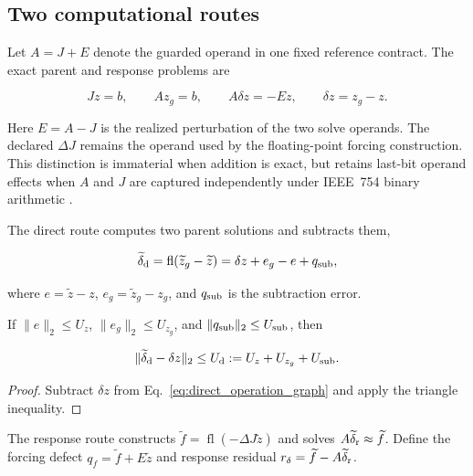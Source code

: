 \subsection{Two computational routes}

Let $A=J+E$ denote the guarded operand in one fixed reference contract.
The exact parent and response problems are
\begin{linenomath*}
\begin{equation}
Jz=b,\qquad Az_g=b,\qquad A\delta z=-Ez,
\qquad \delta z=z_g-z.
\label{eq:route_exact_problems}
\end{equation}
\end{linenomath*}
Here $E=A-J$ is the realized perturbation of the two solve operands. The
declared $\Delta J$ remains the operand used by the floating-point
forcing construction. This distinction is immaterial when addition is exact,
but retains last-bit operand effects when $A$ and $J$ are captured
independently under IEEE~754 binary arithmetic \cite{S09,S10}.

The direct route computes two parent solutions and subtracts them,
\begin{linenomath*}
\begin{equation}
\widetilde\delta_{\rm d}
=\operatorname{fl}(\widetilde z_g-\widetilde z)
=\delta z+e_g-e+q_{\rm sub},
\label{eq:direct_operation_graph}
\end{equation}
\end{linenomath*}
where $e=\widetilde z-z$, $e_g=\widetilde z_g-z_g$, and
$q_{\rm sub}$ is the subtraction error.

\begin{proposition}
\label{prop:p4}
If $\lVert e\rVert_2\leq U_z$,
$\lVert e_g\rVert_2\leq U_{z_g}$, and
$\lVert q_{\rm sub}\rVert_2\leq U_{\rm sub}$, then
\begin{linenomath*}
\begin{equation}
\lVert\widetilde\delta_{\rm d}-\delta z\rVert_2
\leq U_{\rm d}:=U_z+U_{z_g}+U_{\rm sub}.
\label{eq:direct_difference_enclosure}
\end{equation}
\end{linenomath*}
\end{proposition}

\begin{proof}
Subtract $\delta z$ from Eq.~\eqref{eq:direct_operation_graph} and apply
the triangle inequality.
\end{proof}

The response route constructs
$\widetilde f=\operatorname{fl}(-\Delta J\widetilde z)$ and solves
$A\widetilde\delta_{\rm r}\approx\widetilde f$. Define the forcing
defect $q_f=\widetilde f+E\widetilde z$ and response residual
$r_\delta=\widetilde f-A\widetilde\delta_{\rm r}$.

